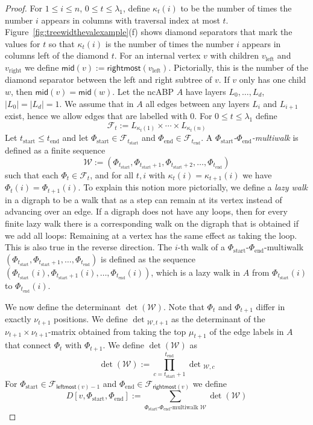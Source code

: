 \documentclass[10pt,a4paper]{article}
\numberwithin{equation}{section}
\theoremstyle{definition}
\newcommand{\CF}{\mathcal{F}}
\newcommand{\CW}{\mathcal{W}}
\newcommand{\la}{\lambda}
\begin{document}
\begin{proof}
For $1 \leq i \leq n$, $0 \leq t \leq \la_1$, define $\kappa_t(i)$ to be the number of times the number $i$ appears in columns with traversal index at most $t$. Figure~\ref{fig:treewidthevalexample}(f) shows diamond separators that mark the values for $t$ so that $\kappa_t(i)$ is the number of times the number $i$ appears in columns left of the diamond $t$. For an internal vertex $v$ with children $v_\text{left}$ and $v_\text{right}$ we define $\textsf{mid}(v) := \textsf{rightmost}(v_\text{left})$. Pictorially, this is the number of the diamond separator between the left and right subtree of $v$. If $v$ only has one child $w$, then $\textsf{mid}(v) = \textsf{mid}(w)$.
Let the ncABP $A$ have layers $L_0, \ldots, L_d$, $|L_0|=|L_d|=1$. We assume that in $A$ all edges between any layers $L_i$ and $L_{i+1}$ exist, hence we allow edges that are labelled with 0.
For $0 \leq t \leq \la_1$ define
\[
\CF_t := L_{\kappa_{t}(1)} \times \cdots \times L_{\kappa_{t}(n)}
\]
%
Let $t_\text{start} \leq t_\text{end}$ and let $\Phi_\text{start} \in \CF_{t_\text{start}}$ and $\Phi_\text{end} \in \CF_{t_\text{end}}$.
A \emph{$\Phi_\text{start}$-$\Phi_\text{end}$-multiwalk} is defined as a finite sequence
\[
\CW := (\Phi_{t_\text{start}}, \Phi_{t_\text{start}+1}, \Phi_{t_\text{start}+2}, \ldots, \Phi_{t_\text{end}})
\]
such that each $\Phi_{t} \in \CF_t$, and for all $t,i$ with $\kappa_t(i)=\kappa_{t+1}(i)$ we have $\Phi_{t}(i)=\Phi_{t+1}(i)$.
To explain this notion more pictorially, we define
a \emph{lazy walk} in a digraph to be a walk that as a step can remain at its vertex instead of advancing over an edge. If a digraph does not have any loops, then for every finite lazy walk there is a corresponding walk on the digraph that is obtained if we add all loops: Remaining at a vertex has the same effect as taking the loop. This is also true in the reverse direction.
The $i$-th walk of a $\Phi_\text{start}$-$\Phi_\text{end}$-multiwalk
$(\Phi_{t_\text{start}}, \Phi_{t_\text{start}+1}, \ldots, \Phi_{t_\text{end}})$
is defined as the sequence
$(\Phi_{t_\text{start}}(i), \Phi_{t_\text{start}+1}(i), \ldots, \Phi_{t_\text{end}}(i))$,
which is a lazy walk in $A$ from $\Phi_{t_\text{start}}(i)$ to $\Phi_{t_\text{end}}(i)$.

We now define the determinant $\det(\CW)$.
Note that $\Phi_{t}$ and $\Phi_{t+1}$ differ in exactly $\nu_{t+1}$ positions.
We define $\det{}_{\CW,t+1}$ as the determinant of the $\nu_{t+1}\times \nu_{t+1}$-matrix obtained from taking the top $\mu_{t+1}$ of the edge labels in $A$ that connect $\Phi_{t}$ with $\Phi_{t+1}$.
We define $\det(\CW)$ as
\[
\det(\CW) := \prod_{c=t_\text{start}+1}^{t_\text{end}}\det{}_{\CW,c}
\]
For $\Phi_\text{start} \in \CF_{\textsf{leftmost}(v)-1}$ and $\Phi_\text{end} \in \CF_{\textsf{rightmost}(v)}$ we define
\begin{equation}\label{def:D}
D[v,\Phi_\text{start},\Phi_\text{end}] :=
\sum_{\Phi_\text{start}\text{-}\Phi_\text{end}\text{-multiwalk } \CW} \det(\CW) \end{equation}


\end{proof}
\end{document}
